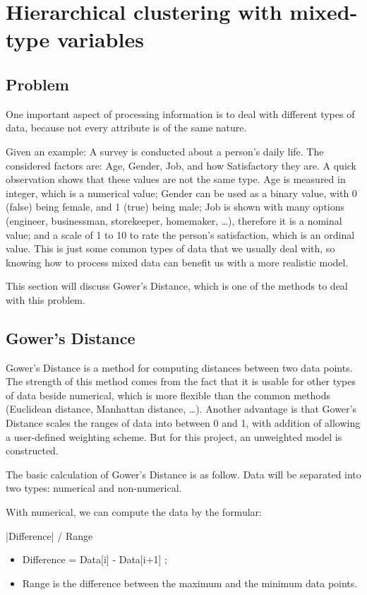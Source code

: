 \section{Hierarchical clustering with mixed-type variables }

\subsection{Problem}
One important aspect of processing information is to deal with different types of data, because not every attribute is of the same nature. 

Given an example: A survey is conducted about a person’s daily life. The considered factors are: Age, Gender, Job, and how Satisfactory they are. A quick observation shows that these values are not the same type. Age is measured in integer, which is a numerical value; Gender can be used as a binary value, with 0 (false) being female, and 1 (true) being male; Job is shown with many options (engineer, businessman, storekeeper, homemaker, …), therefore it is a nominal value; and a scale of 1 to 10 to rate the person’s satisfaction, which is an ordinal value. This is just some common types of data that we usually deal with, so knowing how to process mixed data can benefit us with a more realistic model.

This section will discuss Gower’s Distance, which is one of the methods to deal with this problem. 

\subsection{Gower's Distance}
Gower’s Distance is a method for computing distances between two data points. The strength of this method comes from the fact that it is usable for other types of data beside numerical, which is more flexible than the common methods (Euclidean distance, Manhattan distance, …). Another advantage is that Gower’s Distance scales the ranges of data into between 0 and 1, with addition of allowing a user-defined weighting scheme. But for this project, an unweighted model is constructed. 

The basic calculation of Gower’s Distance is as follow. Data will be separated into two types: numerical and non-numerical.

With numerical, we can compute the data by the formular: 

    \quad |Difference| / Range

    \begin{itemize}
        \item Difference = Data[i] - Data[i+1] ; 
        \item Range is the difference between the maximum and the minimum data points. 
    \end{itemize}

